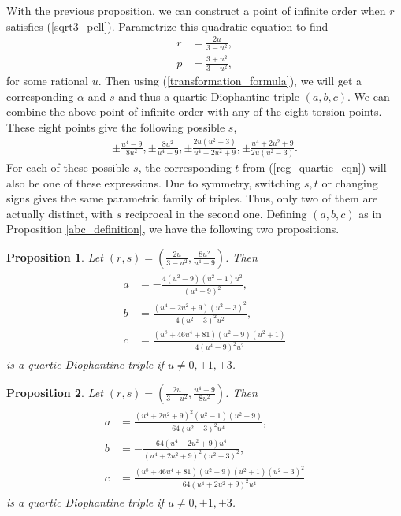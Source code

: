 \documentclass{amsart}
\newtheorem{prop}{Proposition}
\begin{document}
With the previous proposition, we can construct a point of infinite order when $r$ satisfies (\ref{sqrt3_pell}). Parametrize this quadratic equation to find
\begin{align*}
    r &= \frac{2u}{3-u^2}, \\
    p &= \frac{3+u^2}{3-u^2},
\end{align*}
for some rational $u$. Then using (\ref{transformation_formula}), we will get a corresponding $\alpha$ and $s$ and thus a quartic Diophantine triple $(a,b,c)$. 
We can combine the above point of infinite order with any of the eight torsion points. These eight points give the following possible $s$,
\begin{align*}
    \pm \frac{u^4-9}{8u^2}, \pm \frac{8u^2}{u^4-9},\pm\frac{2u(u^2-3)}{u^4+2u^2+9},\pm\frac{u^4+2u^2+9}{2u(u^2-3)}.
\end{align*}
For each of these possible $s$, the corresponding $t$ from (\ref{reg_quartic_eqn}) will also be one of these expressions. Due to symmetry, switching $s,t$ or changing signs gives the same parametric family of triples. Thus, only two of them are actually distinct, with $s$ reciprocal in the second one. Defining $(a,b,c)$ as in Proposition \ref{abc_definition}, we have the following two propositions.
\begin{prop}\label{sqrt_3 parametrizacija 1}
Let $(r,s)=\left(\frac{2u}{3-u^2}, \frac{8u^2}{u^4-9}\right)$. Then
\begin{align*}
\begin{split}
    a &=  -\frac{4(u^2-9)(u^2 - 1)u^2}{(u^4 - 9)^2}, \\
b &=  \frac{(u^4 - 2u^2 + 9)(u^2 + 3)^2}{4(u^2 - 3)^2u^2},\\
c &=  \frac{(u^8 + 46u^4 + 81)(u^2 + 9)(u^2 + 1)}{4(u^4 - 9)^2u^2}
\end{split}
\end{align*}
is a quartic Diophantine triple if $u\neq 0, \pm 1, \pm 3$.
\end{prop}

\begin{prop} \label{sqrt_3 parametrizacija 2}
Let $(r,s)=\left(\frac{2u}{3-u^2}, \frac{u^4-9}{8u^2}\right)$. Then
\begin{align*}
\begin{split}
   a &=  \frac{(u^4+2u^2+9)^2(u^2 - 1)(u^2 - 9)}{64(u^2 - 3)^2u^4}, \\
b &=  -\frac{64(u^4 - 2u^2 + 9)u^4}{(u^4 + 2u^2 + 9)^2(u^2 - 3)^2},\\
c &=  \frac{(u^8 + 46u^4 + 81)(u^2 + 9)(u^2 + 1)(u^2 - 3)^2}{64(u^4 + 2u^2 + 9)^2u^4}
\end{split}
\end{align*}
is a quartic Diophantine triple if $u\neq 0, \pm 1, \pm 3$.
\end{prop}
\end{document}
